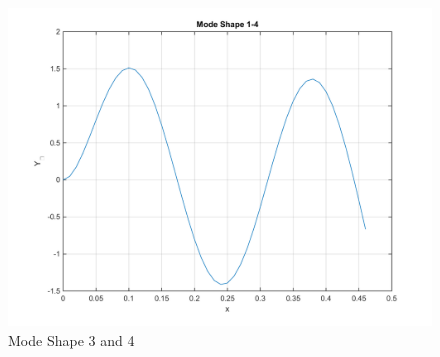 \documentclass[14pt,a4paper]{article}
\begin{document}
\begin{enumerate}
\begin{figure}[htp]
		\includegraphics[scale=0.4]{fn1_VB1_mode4.png}
		\caption{Mode Shape 3 and 4}
	\end{figure}
		

\end{enumerate}
\end{document}
